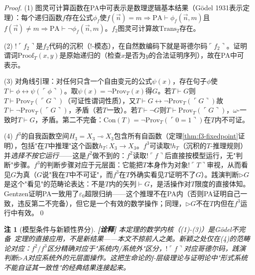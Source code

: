 \documentclass[11pt,a4paper]{article}
\newtheorem{remark}{注}
\newcommand{\lvl}[1]{\hfill\textbf{\footnotesize[#1]}}
\newcommand{\lvI}{\lvl{诠释}}
\newcommand{\lolli}{\multimap}
\newcommand{\bang}{{!}}
\begin{document}
\begin{proof}
(1) 图灵可计算函数在PA中可表示是数理逻辑基本结果（G\"odel 1931表示定理）：每个递归函数$f$存在公式$\phi_f$使$f(\vec{n})=m\Rightarrow\mathrm{PA}\vdash\phi_f(\vec{n},m)$且$f(\vec{n})\neq m\Rightarrow\mathrm{PA}\vdash\neg\phi_f(\vec{n},m)$。$f_2$图灵可计算故$\mathrm{Trans}_2$存在。

(2) $\bang\ulcorner f_2\urcorner$是$f_2$代码的沉积（!-模态），在自然数编码下就是哥德尔码$\ulcorner f_2\urcorner$。证明谓词$\mathrm{Proof}_T(x,y)$是原始递归的（检查$x$是否为$y$的合法证明序列），故在PA中可表示。

(3) 对角线引理：对任何只含一个自由变元的公式$\psi(x)$，存在句子$\phi$使$T\vdash\phi\leftrightarrow\psi(\ulcorner\phi\urcorner)$。取$\psi(x)=\neg\mathrm{Prov}_T(x)$得$G$。若$T\vdash G$则$T\vdash\mathrm{Prov}_T(\ulcorner G\urcorner)$（可证性谓词性质），又$T\vdash G\leftrightarrow\neg\mathrm{Prov}_T(\ulcorner G\urcorner)$故$T\vdash\neg\mathrm{Prov}_T(\ulcorner G\urcorner)$，矛盾（若$T$一致）。若$T\vdash\neg G$则$T\vdash\mathrm{Prov}_T(\ulcorner G\urcorner)$，$\omega$-一致时$T\vdash G$，矛盾。第二不完备：$\mathrm{Con}(T)=\neg\mathrm{Prov}_T(\ulcorner 0=1\urcorner)$在$T$内不可证。

(4) $f^3$的自我函数空间$H_3=X_3\lolli X_3$包含所有自函数（定理\ref{thm:f3-fixedpoint}证明），包括"在$T$中推理"这个函数$h_T:X_3\to X_3$。$f^3$可读取$\bang h_T$（沉积的$T$-推理规则）并\emph{选择不按它运行}——这是$f^2$做不到的：$f^2$读取$\bang\ulcorner f\urcorner$后直接按模型运行，无"判断"步骤。$f^3$的判断步骤对应于元层面：它能把$T$本身作为对象$\bang\ulcorner T\urcorner$审视，从而看见$G$为真（$G$说"我在$T$中不可证"，而$f^3$在$T$外确实看见$T$证明不了$G$）。践演判断$\triangleright G$是这个"看见"的范畴论表达：不是$T$内的矢列$\vdash G$，是活操作对$T$限度的直接体知。Gentzen证明PA一致用了$\varepsilon_0$超限归纳——这个推理不在PA内（否则PA证明自己一致，违反第二不完备），但它是一个有效的数学操作；同理，$\triangleright G$不在$T$内但在$f^3$运行中有效。\qed
\end{proof}

\begin{remark}[模型条件与新颖性界分]\lvI
本定理的数学内核（(1)-(3)）是G\"odel不完备~\cite{godel31}定理的直接应用，不是新结果——本文不掠前人之美。新颖之处仅在(4)的范畴论对应：$f^2/f^3$区分精确对应于"系统内/系统外"区分，$\bang\ulcorner f\urcorner$对应哥德尔码，践演判断$\triangleright A$对应系统外的元层面操作。这把生命论的f-层级理论与证明论中"形式系统不能自证其一致性"的经典结果连接起来。\end{remark}
\end{document}

